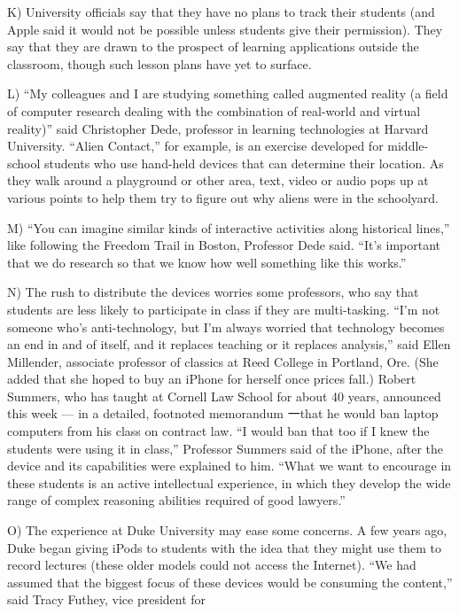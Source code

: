 \documentclass[UTF8,11pt]{ctexart}
\begin{document}
K) University officials say that they have no plans to track their students (and Apple said it would not be possible unless students give their permission). They say that they are drawn to the prospect of learning applications outside the classroom, though such lesson plans have yet to surface.


L) “My colleagues and I are studying something called augmented reality (a field of computer research dealing with the combination of real-world and virtual reality)” said Christopher Dede, professor in learning technologies at Harvard University. “Alien Contact,” for example, is an exercise developed for middle-school students who use hand-held devices that can determine their location. As they walk around a playground or other area, text, video or audio pops up at various points to help them try to figure out why aliens were in the schoolyard.


M) “You can imagine similar kinds of interactive activities along historical lines,” like following the Freedom Trail in Boston, Professor Dede said. “It’s important that we do research so that we know how well something like this works.”


N) The rush to distribute the devices worries some professors, who say that students are less likely to participate in class if they are multi-tasking. “I’m not someone who’s anti-technology, but I’m always worried that technology becomes an end in and of itself, and it replaces teaching or it replaces analysis,” said Ellen Millender, associate professor of classics at Reed College in Portland, Ore. (She added that she hoped to buy an iPhone for herself once prices fall.) Robert Summers, who has taught at Cornell Law School for about 40 years, announced this week — in a detailed, footnoted memorandum 一that he would ban laptop computers from his class on contract law. “I would ban that too if I knew the students were using it in class,” Professor Summers said of the iPhone, after the device and its capabilities were explained to him. “What we want to encourage in these students is an active intellectual experience, in which they develop the wide range of complex reasoning abilities required of good lawyers.”


O) The experience at Duke University may ease some concerns. A few years ago, Duke began giving iPods to students with the idea that they might use them to record lectures (these older models could not access the Internet). “We had assumed that the biggest focus of these devices would be consuming the content,” said Tracy Futhey, vice president for
\end{document}

